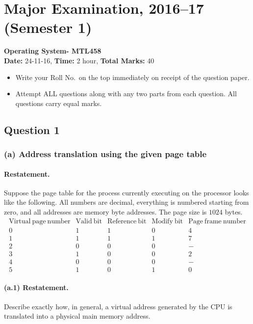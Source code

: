 \section{Major Examination, 2016--17 (Semester 1)}

\noindent\textbf{Operating System- MTL458}\\
\textbf{Date:} 24-11-16,\quad
\textbf{Time:} 2 hour,\quad
\textbf{Total Marks:} 40

\begin{itemize}
  \item Write your Roll No.\ on the top immediately on receipt of the
        question paper.
  \item Attempt ALL questions along with any two parts from each
        question.  All questions carry equal marks.
\end{itemize}

\subsection*{Question 1}

\subsubsection*{(a) Address translation using the given page table}

\paragraph{Restatement.}
Suppose the page table for the process currently executing on the
processor looks like the following.  All numbers are decimal,
everything is numbered starting from zero, and all addresses are
memory byte addresses.  The page size is \(1024\) bytes.
\[
\begin{array}{c|c|c|c|c}
\mathrm{Virtual\ page\ number}&\mathrm{Valid\ bit}&\mathrm{Reference\ bit}&
\mathrm{Modify\ bit}&\mathrm{Page\ frame\ number}\\ \hline
0&1&1&0&4\\
1&1&1&1&7\\
2&0&0&0&-\\
3&1&0&0&2\\
4&0&0&0&-\\
5&1&0&1&0
\end{array}
\]

\paragraph{(a.1) Restatement.}
Describe exactly how, in general, a virtual address generated by the
CPU is translated into a physical main memory address.

